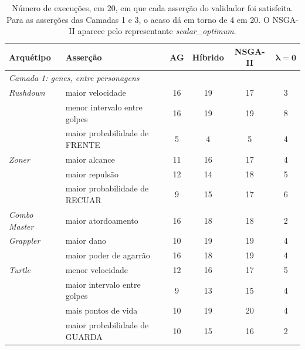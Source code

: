 \begin{table}[htbp]
    \caption[Asserções do validador satisfeitas por braço]{Número de execuções, em 20, em que cada asserção do validador foi satisfeita. Para as asserções das Camadas 1 e 3, o acaso dá em torno de 4 em 20. O NSGA-II aparece pelo representante \textit{scalar\_optimum}.}
    \label{tab: assercoes}
    \centering
    \footnotesize
    \begin{tabularx}{\textwidth}{l X c c c c}
        \toprule
        \textbf{Arquétipo} & \textbf{Asserção} & \textbf{AG} & \textbf{Híbrido} & \textbf{NSGA-II} & $\boldsymbol{\lambda = 0}$ \\
        \midrule
        \multicolumn{6}{l}{\textit{Camada 1: genes, entre personagens}} \\
        \textit{Rushdown}     & maior velocidade                     & 16 & 19 & 17 & 3 \\
                              & menor intervalo entre golpes         & 16 & 19 & 19 & 8 \\
                              & maior probabilidade de FRENTE        & 5  & 4  & 5  & 4 \\
        \textit{Zoner}        & maior alcance                        & 11 & 16 & 17 & 4 \\
                              & maior repulsão                       & 12 & 14 & 18 & 5 \\
                              & maior probabilidade de RECUAR        & 9  & 15 & 17 & 6 \\
        \textit{Combo Master} & maior atordoamento                   & 16 & 18 & 18 & 2 \\
        \textit{Grappler}     & maior dano                           & 10 & 19 & 19 & 4 \\
                              & maior poder de agarrão               & 16 & 18 & 19 & 4 \\
        \textit{Turtle}       & menor velocidade                     & 12 & 16 & 17 & 5 \\
                              & maior intervalo entre golpes         & 9  & 13 & 15 & 4 \\
                              & mais pontos de vida                  & 10 & 19 & 20 & 4 \\
                              & maior probabilidade de GUARDA        & 10 & 15 & 16 & 2 \\

\end{tabularx}
\end{table}
